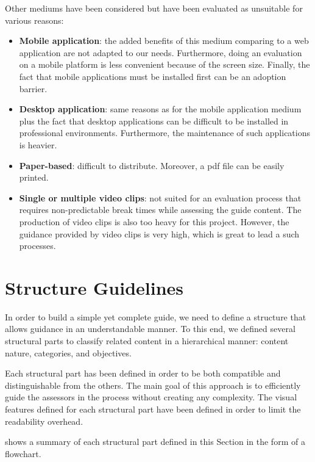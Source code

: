 Other mediums have been considered but have been evaluated as unsuitable for various reasons:
\begin{itemize}
    \item \textbf{Mobile application}: the added benefits of this medium comparing to a web application are not adapted to our needs. Furthermore, doing an evaluation on a mobile platform is less convenient because of the screen size. Finally, the fact that mobile applications must be installed first can be an adoption barrier.
    \item \textbf{Desktop application}: same reasons as for the mobile application medium plus the fact that desktop applications can be difficult to be installed in professional environments. Furthermore, the maintenance of such applications is heavier.
    \item \textbf{Paper-based}: difficult to distribute. Moreover, a \gls{pdf} file can be easily printed. 
    \item \textbf{Single or multiple video clips}: not suited for an evaluation process that requires non-predictable break times while assessing the guide content. The production of video clips is also too heavy for this project. However, the guidance provided by video clips is very high, which is great to lead a such processes.
\end{itemize}

\section{Structure Guidelines}
\label{sec:proposal_structure}

In order to build a simple yet complete guide, we need to define a structure that allows guidance in an understandable manner. To this end, we defined several structural parts to classify related content in a hierarchical manner: content nature, categories, and objectives.

Each structural part has been defined in order to be both compatible and distinguishable from the others. The main goal of this approach is to efficiently guide the assessors in the process without creating any complexity. The visual features defined for each structural part have been defined in order to limit the readability overhead.

 shows a summary of each structural part defined in this Section in the form of a flowchart.

